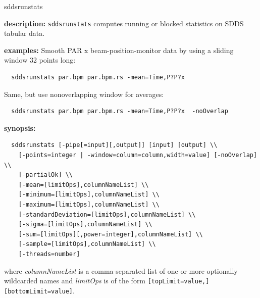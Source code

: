 \begin{sddsprog}{sddsrunstats}
  \item \textbf{description:} \verb|sddsrunstats| computes running or blocked statistics on SDDS tabular data.

  \item \textbf{examples:}
  Smooth PAR x beam-position-monitor data by using a sliding window 32 points long:
  \begin{verbatim}
  sddsrunstats par.bpm par.bpm.rs -mean=Time,P?P?x
  \end{verbatim}
  Same, but use nonoverlapping window for averages:
  \begin{verbatim}
  sddsrunstats par.bpm par.bpm.rs -mean=Time,P?P?x  -noOverlap
  \end{verbatim}

  \item \textbf{synopsis:}
  \begin{verbatim}
  sddsrunstats [-pipe[=input][,output]] [input] [output] \\
    [-points=integer | -window=column=column,width=value] [-noOverlap] \\
    [-partialOk] \\
    [-mean=[limitOps],columnNameList] \\
    [-minimum=[limitOps],columnNameList] \\
    [-maximum=[limitOps],columnNameList] \\
    [-standardDeviation=[limitOps],columnNameList] \\
    [-sigma=[limitOps],columnNameList] \\
    [-sum=[limitOps][,power=integer],columnNameList] \\
    [-sample=[limitOps],columnNameList] \\
    [-threads=number]
  \end{verbatim}
  where \emph{columnNameList} is a comma-separated list of one or more optionally wildcarded names and \emph{limitOps} is of the form \verb|[topLimit=value,][bottomLimit=value]|.


\end{sddsprog}
